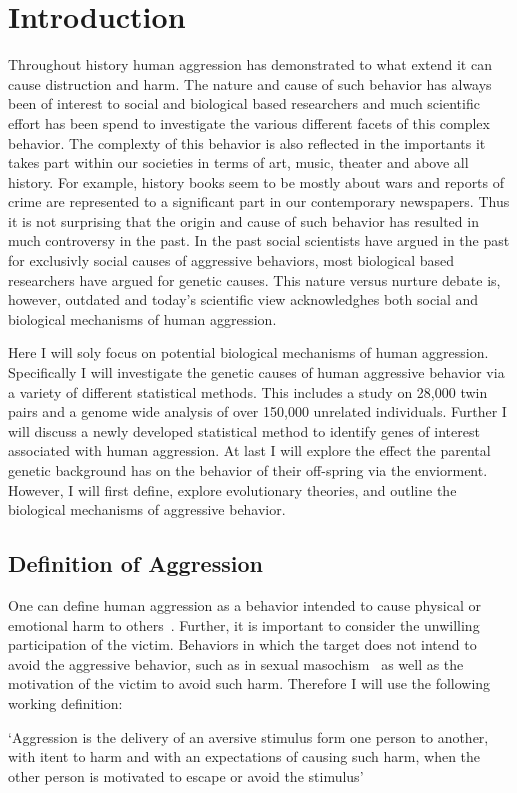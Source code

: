 \chapter{Introduction}
\label{cha:introduction}

Throughout history human aggression has demonstrated to what extend it can cause distruction and harm.
The nature and cause of such behavior has always been of interest to social and biological based researchers and much scientific effort has been spend to investigate the various different facets of this complex behavior.
The complexty of this behavior is also reflected in the importants it takes part within our societies in terms of art, music, theater and above all history.
For example, history books seem to be mostly about wars and reports of crime are represented to a significant part in our contemporary newspapers.
Thus it is not surprising that the origin and cause of such behavior has resulted in much controversy in the past.
In the past social scientists have argued in the past for exclusivly social causes of aggressive behaviors, most biological based researchers have argued for genetic causes.
This nature versus nurture debate is, however, outdated and today's scientific view acknowledghes both social and biological mechanisms of human aggression.

Here I will soly focus on potential biological mechanisms of human aggression.
Specifically I will investigate the genetic causes of human aggressive behavior via a variety of different statistical methods.
This includes a study on 28,000 twin pairs and a genome wide analysis of over 150,000 unrelated individuals.
Further I will discuss a newly developed statistical method to identify genes of interest associated with human aggression.
At last I will explore the effect the parental genetic background has on the behavior of their off-spring via the enviorment.
However, I will first define, explore evolutionary theories, and outline the biological mechanisms of aggressive behavior. 

\section{Definition of Aggression}
\label{sec:overview_of_reseach_in_aggression}

One can define human aggression as a behavior intended to cause physical or emotional harm to others~\cite{Anderson2002}.
Further, it is important to consider the unwilling participation of the victim.
Behaviors in which the target does not intend to avoid the aggressive behavior, such as in sexual masochism~\cite{Berkowitz1993,Baumeister1989,Baron2007,Geen2001} as well as the motivation of the victim to avoid such harm.  
Therefore I will use the following working definition:
\begin{mydef}[Aggression]\label{def:aggression}
	`Aggression is the delivery of an aversive stimulus form one person to another, with itent to harm and with an expectations of causing such harm, when the other person is motivated to escape or avoid the stimulus'~\cite{Geen2001}
\end{mydef}

